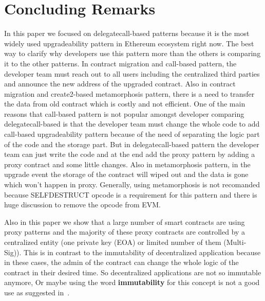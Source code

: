



\section{Concluding Remarks}



In this paper we focused on delegatecall-based patterns because it is the most widely used upgradeability pattern in Ethereum ecosystem right now. The best way to clarify why developers use this pattern more than the others is comparing it to the other patterns. In contract migration and call-based pattern, the developer team must reach out to all users including the centralized third parties and announce the new address of the upgraded contract. Also in contract migration and create2-based metamorphosis pattern, there is a need to transfer the data from old contract which is costly and not efficient. One of the main reasons that call-based pattern is not popular amongst developer comparing delegatecall-based is that the developer team must change the whole code to add call-based upgradeability pattern because of the need of separating the logic part of the code and the storage part. But in delegatecall-based pattern the developer team can just write the code and at the end add the proxy pattern by adding a proxy contract and some little changes. Also in metamorphosis pattern, in the upgrade event the storage of the contract will wiped out and the data is gone which won't happen in proxy. Generally, using metamorphosis is not recomanded because SELFDESTRUCT opcode is a requirement for this pattern and there is huge discussion to remove the opcode from EVM.

Also in this paper we show that a large number of smart contracts are using proxy patterns and the majority of these proxy contracts are controlled by a centralized entity (one private key (EOA) or limited number of them (Multi-Sig)). This is in contrast to the immutability of decentralized application because in these cases, the admin of the contract can change the whole logic of the contract in their desired time. So decentralized applications are not so immutable anymore, Or maybe using the word \textbf{immutability} for this concept is not a good use as suggested in~\cite{walch2016path}.

